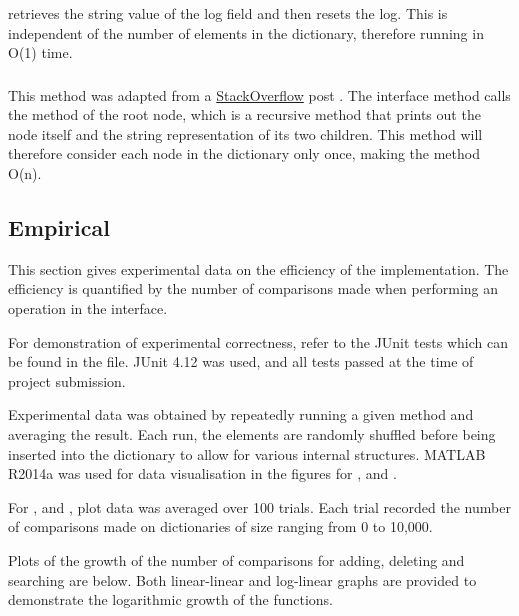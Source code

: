 \subsubsection{}
 retrieves the string value of the  log field and then resets the log. This is independent of the number of elements in the dictionary, therefore running in O(1) time.

\subsubsection{}
This method was adapted from a \href{http://stackoverflow.com/}{StackOverflow} post \cite{stackoverflow}. The interface method  calls the  method of the root node, which is a recursive method that prints out the node itself and the string representation of its two children. This method will therefore consider each node in the dictionary only once, making the method O(n).

\subsection{Empirical}

This section gives experimental data on the efficiency of the implementation. The efficiency is quantified by the number of comparisons made when performing an operation in the  interface.

For demonstration of experimental correctness, refer to the JUnit tests which can be found in the  file. JUnit 4.12 was used, and all tests passed at the time of project submission.

Experimental data was obtained by repeatedly running a given method and averaging the result. Each run, the elements are randomly shuffled before being inserted into the dictionary to allow for various internal structures. MATLAB R2014a was used for data visualisation in the figures for ,  and .

For ,  and , plot data was averaged over 100 trials. Each trial recorded the number of comparisons made on dictionaries of size ranging from 0 to 10,000.

Plots of the growth of the number of comparisons for adding, deleting and searching are below. Both linear-linear and log-linear graphs are provided to demonstrate the logarithmic growth of the functions.

